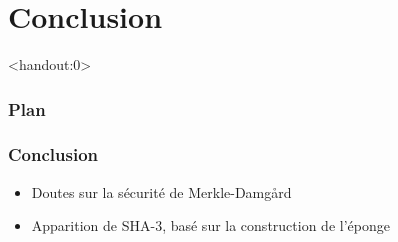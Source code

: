 \section{Conclusion}
\begin{frame}<handout:0>
  \frametitle{Plan}
  \tableofcontents[currentsection,subsectionstyle=hide]
\end{frame}

\begin{frame}
  \frametitle{Conclusion}
  \vfill
  \begin{itemize}
  \item{Doutes sur la sécurité de Merkle-Damg\r{a}rd}
    \vfill
  \item{Apparition de SHA-3, basé sur la construction de l'éponge}
  \end{itemize}
\end{frame}

